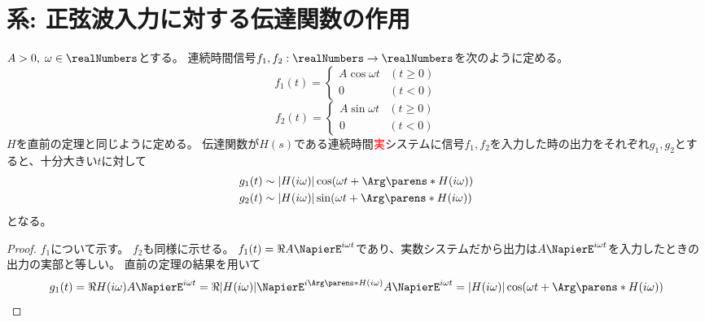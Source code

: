 		\section{系: 正弦波入力に対する伝達関数の作用}
			\begin{shadebox}
				$A>0,\;\omega \in \realNumbers$とする。
				連続時間信号$f_1,f_2: \realNumbers \to \realNumbers$を次のように定める。
				\[
					f_1(t) =
					\begin{cases}
						A\cos\omega t & (t\geq 0) \\
						0 & (t<0)
					\end{cases}
				\]
				\[
					f_2(t) =
					\begin{cases}
						A\sin\omega t & (t\geq 0) \\
						0 & (t<0)
					\end{cases}
				\]
				$H$を直前の定理と同じように定める。
				伝達関数が$H(s)$である連続時間\textcolor{red}{実}システムに信号$f_1,f_2$を入力した時の出力をそれぞれ$g_1,g_2$とすると、十分大きい$t$に対して
				\begin{align*}
					g_1(t) &\sim |H(i\omega)|\cos(\omega t + \Arg\parens*{H(i\omega)}) \\
					g_2(t) &\sim |H(i\omega)|\sin(\omega t + \Arg\parens*{H(i\omega)})
				\end{align*}
				となる。
			\end{shadebox}
			\begin{proof}
				\quad\par
				$f_1$について示す。
				$f_2$も同様に示せる。
				$f_1(t) = \Re{A\NapierE^{i\omega t}}$であり、実数システムだから出力は$A\NapierE^{i\omega t}$を入力したときの出力の実部と等しい。
				直前の定理の結果を用いて
				\[ g_1(t) = \Re{H(i\omega)A\NapierE^{i\omega t}} = \Re{|H(i\omega)|\NapierE^{i\Arg\parens*{H(i\omega)}}A\NapierE^{i\omega t}} = |H(i\omega)|\cos (\omega t + \Arg\parens*{H(i\omega)}) \]
			\end{proof}
